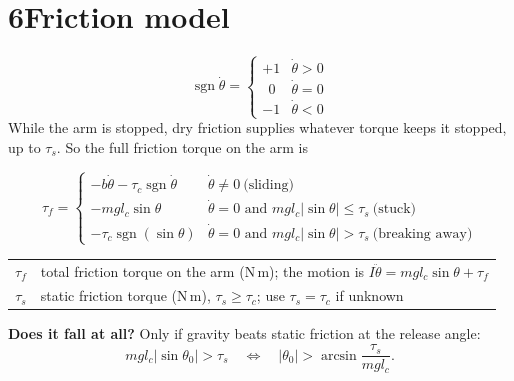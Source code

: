 \documentclass[11pt]{article}
\makeatletter
\newcommand{\sgn}{\operatorname{sgn}}
\newcommand{\where}[1]{\par\vspace{-2pt}{\small\color{muted}\textit{where}}\par\vspace{-2pt}
  {\small\renewcommand{\arraystretch}{1.08}\begin{tabular}{@{}>{$}r<{$}@{\;\;}l@{}}#1\end{tabular}}}
\makeatother
\begin{document}
\section*{6\quad Friction model}
\begin{equation}
\sgn\dot\theta=\begin{cases}+1 & \dot\theta>0\\ \ \ 0 & \dot\theta=0\\ -1 & \dot\theta<0\end{cases}
\end{equation}
While the arm is stopped, dry friction supplies whatever torque keeps it stopped, up to $\tau_s$. So the full friction torque on the arm is
\begin{result}
\begin{equation}
\tau_f=\begin{cases}
-b\dot\theta-\tau_c\sgn\dot\theta & \dot\theta\neq0 \ \text{(sliding)}\\[2pt]
-m g l_c\sin\theta & \dot\theta=0 \text{ and } m g l_c|\sin\theta|\le\tau_s\ \text{(stuck)}\\[2pt]
-\tau_c\sgn(\sin\theta) & \dot\theta=0 \text{ and } m g l_c|\sin\theta|>\tau_s\ \text{(breaking away)}
\end{cases}
\end{equation}
\where{\tau_f & total friction torque on the arm (N\,m); the motion is $I\ddot\theta=m g l_c\sin\theta+\tau_f$\\ \tau_s & static friction torque (N\,m), $\tau_s\ge\tau_c$; use $\tau_s=\tau_c$ if unknown}
\end{result}
\textbf{Does it fall at all?} Only if gravity beats static friction at the release angle:
\begin{equation}
m g l_c|\sin\theta_0|>\tau_s\quad\Longleftrightarrow\quad |\theta_0|>\arcsin\frac{\tau_s}{m g l_c}.
\end{equation}

\end{document}
